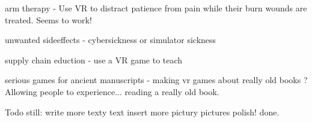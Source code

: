 \documentclass[11pt]{article}
\begin{document}
arm therapy - Use VR to distract patience from pain while their burn wounds are treated. Seems to work!

unwanted sideeffects - cybersickness or simulator sickness

supply chain eduction - use a VR game to teach

serious games for ancient manuscripts - making vr games about really old books ? Allowing people to experience... reading a really old book.

Todo still:
write more texty text
insert more pictury pictures
polish!
done.
\end{document}
